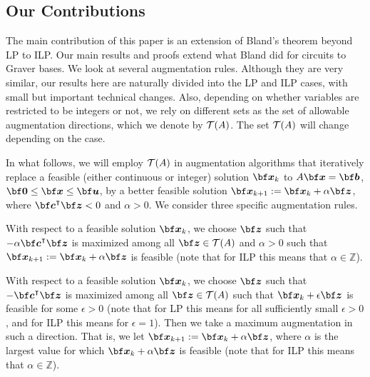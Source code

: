 \documentclass[moor]{informs1hack}              %
\newcommand{\Z}{{\mathbb Z}}
\def\ve#1{\mathchoice{\mbox{\boldmath$\displaystyle\bf#1$}}
{\mbox{\boldmath$\textstyle\bf#1$}}
{\mbox{\boldmath$\scriptstyle\bf#1$}}
{\mbox{\boldmath$\scriptscriptstyle\bf#1$}}}
\newcommand\veb{{\ve b}}
\newcommand\vecc{{\ve c}}
\newcommand\veu{{\ve u}}
\newcommand\vex{{\ve x}}
\newcommand\vez{{\ve z}}
\newcommand{\T}{{\intercal}} %
\begin{document}

\subsection{Our Contributions}

The main contribution of this paper is an extension of Bland's theorem beyond LP to ILP.
Our main results and proofs extend what Bland did for circuits to Graver bases. We look at several  augmentation rules.  
Although they are very similar, our results here are naturally divided into the LP and ILP cases, with small but important 
technical changes. Also, depending on whether variables are restricted to be integers or not, we rely on different sets as the set 
of allowable augmentation directions, which we denote by $\cal T (A)$. The set $\cal T(A)$ will change depending on the case.

In what follows, we will employ $\cal T(A)$ in augmentation algorithms that iteratively replace a feasible (either continuous or integer)
solution $\vex_k$ to $A\vex=\veb$, $\ve 0\leq\vex\leq\veu$, by a better feasible solution $\vex_{k+1}:=\vex_k+\alpha\vez$, where
 $\vecc^\T\vez<0$ and $\alpha>0$. We consider three specific augmentation rules.

\medskip
  \begin{definition}
    With respect to a feasible solution $\vex_k$, we choose  $\vez$ such that $-\alpha\vecc^\T\vez$ is maximized among all $\vez\in{\cal T}(A)$ and $\alpha>0$ such that $\vex_{k+1} :=\vex_k + \alpha \vez$ is feasible (note that for ILP this means that $\alpha\in\Z$).
  \end{definition}

\medskip

  \begin{definition}
    With respect to a feasible solution $\vex_k$, we choose  $\vez$ such that $-\vecc^\T\vez$ is maximized among all $\vez\in\cal T(A)$ such that $\vex_k + \epsilon\vez$ is feasible for some $\epsilon>0$ (note that for LP this means for all sufficiently small $\epsilon>0$, and for ILP this means for $\epsilon=1$). Then we take a maximum augmentation in such a direction. That is, we let $\vex_{k+1} := \vex_k + \alpha \vez$, where $\alpha$ is the largest value for which $\vex_k + \alpha \vez$ is feasible (note that for ILP this means that $\alpha\in\Z$).
  \end{definition}

\medskip
\end{document}
